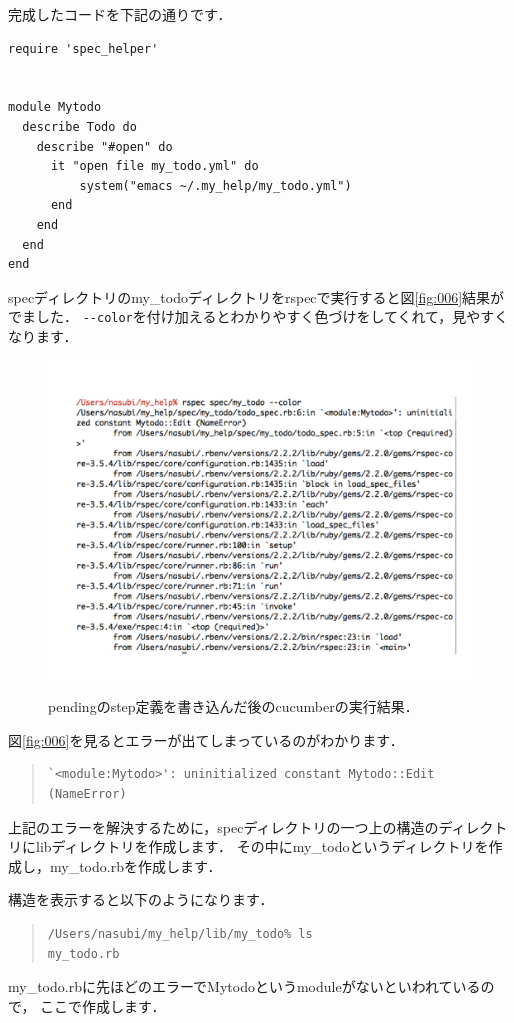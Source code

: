 完成したコードを下記の通りです．
\begin{lstlisting}[style=customRuby,basicstyle={\scriptsize\ttfamily}]
require 'spec_helper'


module Mytodo
  describe Todo do
    describe "#open" do
      it "open file my_todo.yml" do
          system("emacs ~/.my_help/my_todo.yml")
      end
    end
  end
end

\end{lstlisting}
specディレクトリのmy\_todoディレクトリをrspecで実行すると図\ref{fig:006}結果がでました．
\verb|--color|を付け加えるとわかりやすく色づけをしてくれて，見やすくなります．

\begin{figure}[htbp]\begin{center}
\includegraphics[width=12cm,bb= 0 0 937 753]{../figs/./my_help_nasu.006.jpeg}
\caption{pendingのstep定義を書き込んだ後のcucumberの実行結果．}
\label{fig:006}
\label{default}\end{center}\end{figure}
図\ref{fig:006}を見るとエラーが出てしまっているのがわかります．
\begin{quote}\begin{verbatim}
`<module:Mytodo>': uninitialized constant Mytodo::Edit (NameError)
\end{verbatim}\end{quote}
上記のエラーを解決するために，specディレクトリの一つ上の構造のディレクトリにlibディレクトリを作成します．
その中にmy\_todoというディレクトリを作成し，my\_todo.rbを作成します．

構造を表示すると以下のようになります．
\begin{quote}\begin{verbatim}
/Users/nasubi/my_help/lib/my_todo% ls
my_todo.rb
\end{verbatim}\end{quote}
my\_todo.rbに先ほどのエラーでMytodoというmoduleがないといわれているので，
ここで作成します．

